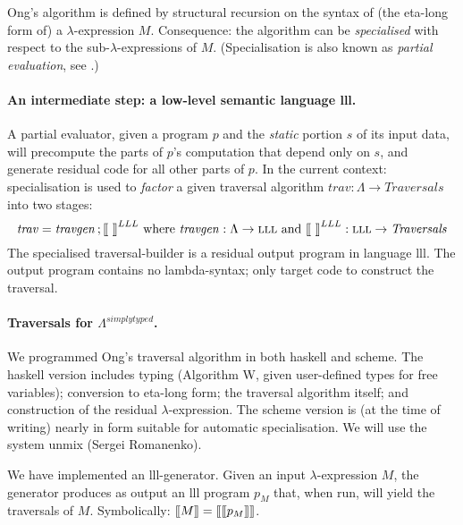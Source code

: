 \documentclass{article}
\begin{document}
Ong's  algorithm \cite{ong2015} is defined by structural recursion on the syntax of (the eta-long form of) a $\lambda$-expression $M$. 
Consequence: the  algorithm can be {\em specialised} with respect to the sub-$\lambda$-expressions of 
$M$. (Specialisation is also known as {\em partial evaluation}, see  \cite{JGS93}.)



\paragraph{An intermediate step: a low-level semantic language {\sc lll}.}



A partial evaluator, 
given a program $p$ and the {\em static} portion $s$ of its input data, will precompute the parts of $p$'s computation  that depend only on $s$, and generate residual code for all other parts of $p$. 
In the current context: specialisation is used to {\em factor} a given traversal algorithm
$ \mathit{trav} : \Lambda \to \mathit{Traversals}$ into two stages:
$$
 \mathit{trav} = \mathit{travgen}\, ; \mbox{$\lbrack\hspace{-0.3ex}\lbrack$}\ \mbox{$\rbrack\hspace{-0.3ex}\rbrack$}^{LLL}  
 \mbox{\ where\  }  
       \mathit{travgen}:\Lambda \to \mbox{\sc lll} 
 \mbox{\ and\ }
 \mbox{$\lbrack\hspace{-0.3ex}\lbrack$}\ \mbox{$\rbrack\hspace{-0.3ex}\rbrack$}^{LLL}  : \mbox{\sc lll} \to \mathit{Traversals}
$$
The specialised traversal-builder is a residual output program in language {\sc lll}. The output program  contains  no lambda-syntax; only target code to construct the traversal. 


\paragraph{Traversals for $\Lambda^{simplytyped}$.}
\hfill


We programmed Ong's  traversal algorithm  in both {\sc haskell} and {\sc scheme}. The {\sc haskell} version includes typing (Algorithm W, given user-defined types for free variables); conversion to eta-long form;  the traversal algorithm itself; and construction of the residual $\lambda$-expression.
The {\sc scheme} version is (at the time of writing) nearly in form suitable for automatic specialisation. We will use  the system {\sc unmix}  (Sergei Romanenko).

We have implemented an {\sc lll}-generator. Given an input $\lambda$-expression $M$, the generator produces as output an {\sc lll}  program $p_M$  that, when run, will yield the traversals of $M$. Symbolically:
$\mbox{$\lbrack\hspace{-0.3ex}\lbrack$} M\mbox{$\rbrack\hspace{-0.3ex}\rbrack$} = \mbox{$\lbrack\hspace{-0.3ex}\lbrack$} \mbox{$\lbrack\hspace{-0.3ex}\lbrack$} p_M\mbox{$\rbrack\hspace{-0.3ex}\rbrack$} \mbox{$\rbrack\hspace{-0.3ex}\rbrack$}$. 
\end{document}
